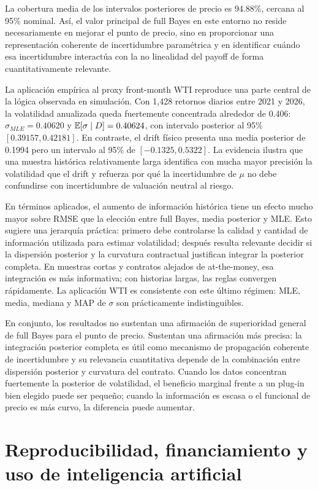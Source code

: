 La cobertura media de los intervalos posteriores de precio es 94.88\%, cercana al 95\% nominal. Así, el valor principal de full Bayes en este entorno no reside necesariamente en mejorar el punto de precio, sino en proporcionar una representación coherente de incertidumbre paramétrica y en identificar cuándo esa incertidumbre interactúa con la no linealidad del payoff de forma cuantitativamente relevante.

La aplicación empírica al proxy front-month WTI reproduce una parte central de la lógica observada en simulación. Con 1,428 retornos diarios entre 2021 y 2026, la volatilidad anualizada queda fuertemente concentrada alrededor de 0.406: $\widehat\sigma_{MLE}=0.40620$ y $\mathbb{E}[\sigma\mid D]=0.40624$, con intervalo posterior al 95\% $[0.39157,0.42181]$. En contraste, el drift físico presenta una media posterior de 0.1994 pero un intervalo al 95\% de $[-0.1325,0.5322]$. La evidencia ilustra que una muestra histórica relativamente larga identifica con mucha mayor precisión la volatilidad que el drift y refuerza por qué la incertidumbre de $\mu$ no debe confundirse con incertidumbre de valuación neutral al riesgo.

En términos aplicados, el aumento de información histórica tiene un efecto mucho mayor sobre RMSE que la elección entre full Bayes, media posterior y MLE. Esto sugiere una jerarquía práctica: primero debe controlarse la calidad y cantidad de información utilizada para estimar volatilidad; después resulta relevante decidir si la dispersión posterior y la curvatura contractual justifican integrar la posterior completa. En muestras cortas y contratos alejados de at-the-money, esa integración es más informativa; con historias largas, las reglas convergen rápidamente. La aplicación WTI es consistente con este último régimen: MLE, media, mediana y MAP de $\sigma$ son prácticamente indistinguibles.

En conjunto, los resultados no sustentan una afirmación de superioridad general de full Bayes para el punto de precio. Sustentan una afirmación más precisa: la integración posterior completa es útil como mecanismo de propagación coherente de incertidumbre y su relevancia cuantitativa depende de la combinación entre dispersión posterior y curvatura del contrato. Cuando los datos concentran fuertemente la posterior de volatilidad, el beneficio marginal frente a un plug-in bien elegido puede ser pequeño; cuando la información es escasa o el funcional de precio es más curvo, la diferencia puede aumentar.

\section*{Reproducibilidad, financiamiento y uso de inteligencia artificial}

